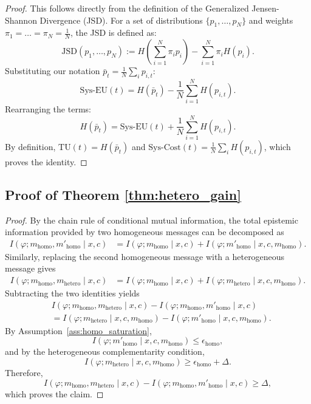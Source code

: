 \documentclass{article}
\theoremstyle{plain}
\theoremstyle{definition}
\theoremstyle{remark}
\begin{document}
\begin{proof}
This follows directly from the definition of the Generalized Jensen-Shannon Divergence (JSD).
For a set of distributions $\{p_1, \dots, p_N\}$ and weights $\pi_1 = \dots = \pi_N = \frac{1}{N}$, the JSD is defined as:
\begin{equation}
    \mathrm{JSD}(p_1, \dots, p_N) := H\left(\sum_{i=1}^N \pi_i p_i\right) - \sum_{i=1}^N \pi_i H(p_i).
\end{equation}
Substituting our notation $\bar{p}_t = \frac{1}{N}\sum_i p_{i,t}$:
\begin{equation}
    \mathrm{Sys\mbox{-}EU}(t) = H(\bar{p}_t) - \frac{1}{N}\sum_{i=1}^N H(p_{i,t}).
\end{equation}
Rearranging the terms:
\begin{equation}
    H(\bar{p}_t) = \mathrm{Sys\mbox{-}EU}(t) + \frac{1}{N}\sum_{i=1}^N H(p_{i,t}).
\end{equation}
By definition, $\mathrm{TU}(t) = H(\bar{p}_t)$ and $\mathrm{Sys\mbox{-}Cost}(t) = \frac{1}{N}\sum_i H(p_{i,t})$, which proves the identity.
\end{proof}



\subsection{Proof of Theorem \ref{thm:hetero_gain}}
\label{app:proof_theo3}
\begin{proof}
By the chain rule of conditional mutual information, the total epistemic information provided by two homogeneous messages can be decomposed as
\begin{align}
I(\varphi; m_{\mathrm{homo}},m'_{\mathrm{homo}} \mid x,c)
&=
I(\varphi; m_{\mathrm{homo}} \mid x,c)
+
I(\varphi; m'_{\mathrm{homo}} \mid x,c,m_{\mathrm{homo}}).
\end{align}
Similarly, replacing the second homogeneous message with a heterogeneous message gives
\begin{align}
I(\varphi; m_{\mathrm{homo}},m_{\mathrm{hetero}} \mid x,c)
&=
I(\varphi; m_{\mathrm{homo}} \mid x,c)
+
I(\varphi; m_{\mathrm{hetero}} \mid x,c,m_{\mathrm{homo}}).
\end{align}
Subtracting the two identities yields
\begin{align}
& I(\varphi; m_{\mathrm{homo}},m_{\mathrm{hetero}} \mid x,c)
-
I(\varphi; m_{\mathrm{homo}},m'_{\mathrm{homo}} \mid x,c) \nonumber \\
&=
I(\varphi; m_{\mathrm{hetero}} \mid x,c,m_{\mathrm{homo}})
-
I(\varphi; m'_{\mathrm{homo}} \mid x,c,m_{\mathrm{homo}}).
\end{align}
By Assumption~\ref{ass:homo_saturation},
\[
I(\varphi; m'_{\mathrm{homo}} \mid x,c,m_{\mathrm{homo}})
\le
\epsilon_{\mathrm{homo}},
\]
and by the heterogeneous complementarity condition,
\[
I(\varphi; m_{\mathrm{hetero}} \mid x,c,m_{\mathrm{homo}})
\ge
\epsilon_{\mathrm{homo}}+\Delta.
\]
Therefore,
\[
I(\varphi; m_{\mathrm{homo}},m_{\mathrm{hetero}} \mid x,c)
-
I(\varphi; m_{\mathrm{homo}},m'_{\mathrm{homo}} \mid x,c)
\ge
\Delta,
\]
which proves the claim.
\end{proof}
\end{document}
